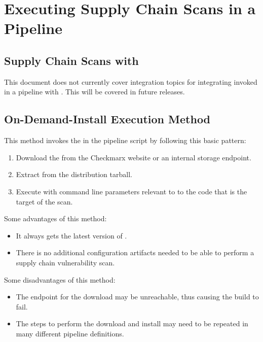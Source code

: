 \chapter{Executing Supply Chain Scans in a Pipeline}


\section{Supply Chain Scans with \cxone}

This document does not currently cover integration topics for integrating
\scaresolver invoked in a pipeline with \cxone.  This will be covered in 
future releases.


\section{\scaresolver On-Demand-Install Execution Method}

This method invokes the \scaresolver in the pipeline script by following this
basic pattern:

\begin{enumerate}
    \item Download the \scaresolver from the Checkmarx website or
    an internal storage endpoint.
    \item Extract \scaresolver from the distribution tarball.
    \item Execute \scaresolver with command line parameters relevant to
    to the code that is the target of the scan.
\end{enumerate}

Some advantages of this method:

\begin{itemize}
    \item It always gets the latest version of \scaresolver.
    \item There is no additional configuration artifacts needed to be able to
    perform a supply chain vulnerability scan.
\end{itemize}



Some disadvantages of this method:
\begin{itemize}
    \item The endpoint for the download may be unreachable, thus causing the build to fail.
    \item The steps to perform the download and install may need to be repeated
    in many different pipeline definitions.
\end{itemize}



